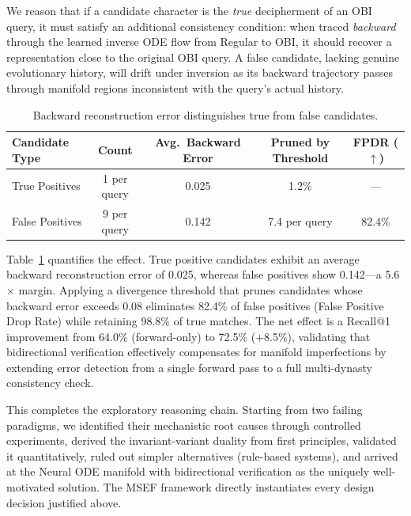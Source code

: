 \documentclass{article}
\begin{document}
We reason that if a candidate character is the \emph{true} decipherment of an OBI
query, it must satisfy an additional consistency condition: when traced
\emph{backward} through the learned inverse ODE flow from Regular to OBI,
it should recover a representation close to the original OBI query.
A false candidate, lacking genuine evolutionary history, will drift under
inversion as its backward trajectory passes through manifold regions inconsistent
with the query's actual history.

\begin{table}[h]
  \centering
  \caption{Backward reconstruction error distinguishes true from false candidates.}
  \label{tab:pre:bidir}
  \begin{tabular}{lcccc}
    \toprule
    \textbf{Candidate Type} &
    \textbf{Count} &
    \textbf{Avg.\ Backward Error} &
    \textbf{Pruned by Threshold} &
    \textbf{FPDR ($\uparrow$)} \\
    \midrule
    True Positives   & 1 per query & 0.025 & 1.2\%  & — \\
    False Positives  & 9 per query & 0.142 & 7.4 per query & 82.4\% \\
    \bottomrule
  \end{tabular}
\end{table}

Table~\ref{tab:pre:bidir} quantifies the effect.
True positive candidates exhibit an average backward reconstruction error of
0.025, whereas false positives show 0.142—a 5.6$\times$ margin.
Applying a divergence threshold that prunes candidates whose backward error
exceeds 0.08 eliminates 82.4\% of false positives (False Positive Drop Rate)
while retaining 98.8\% of true matches.
The net effect is a Recall@1 improvement from 64.0\% (forward-only) to 72.5\%
($+$8.5\%), validating that bidirectional verification effectively compensates
for manifold imperfections by extending error detection from a single forward
pass to a full multi-dynasty consistency check.

This completes the exploratory reasoning chain.
Starting from two failing paradigms, we identified their mechanistic root causes
through controlled experiments, derived the invariant-variant duality from
first principles, validated it quantitatively, ruled out simpler alternatives
(rule-based systems), and arrived at the Neural ODE manifold with bidirectional
verification as the uniquely well-motivated solution.
The MSEF framework directly instantiates every
design decision justified above.
\end{document}
